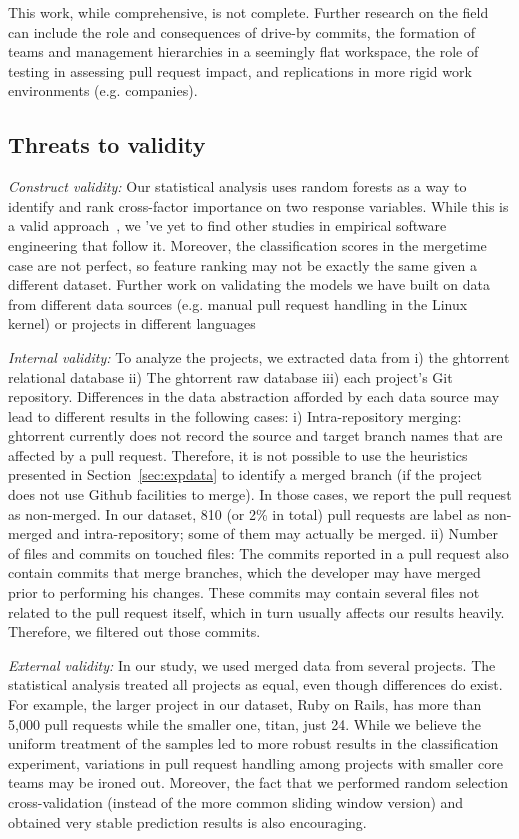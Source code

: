\documentclass{sig-alternate}
\begin{document}
This work, while comprehensive, is not complete. Further research
on the field can include the role and consequences of drive-by commits, 
the formation of teams and management hierarchies in a seemingly flat
workspace, the role of testing in assessing pull request impact,
and replications in more rigid work environments (e.g. companies).

\subsection{Threats to validity}

\emph{Construct validity:} Our statistical analysis uses random forests as a way
to identify and rank cross-factor importance on two response variables.  While
this is a valid approach~\cite{Genue10}, we 've yet to find other studies in
empirical software engineering that follow it. Moreover, the classification
scores in the \textsf{mergetime} case are not perfect, so feature ranking may
not be exactly the same given a different dataset. Further work on validating
the models we have built on data from different data sources (e.g. manual pull
request handling in the Linux kernel) or projects in different languages 

\emph{Internal validity:}
To analyze the projects, we extracted data from i) the {\sc ght}orrent relational
database ii) The {\sc ght}orrent raw database iii) each project's Git repository.
Differences in the data abstraction afforded by each data source may
lead to different results in the following cases: 
i) Intra-repository merging: {\sc ght}orrent currently does not record the source
    and target branch names that are affected by a pull request. Therefore, it
    is not possible to use the heuristics presented in
    Section~\ref{sec:expdata} to identify a merged branch (if the project
    does not use Github facilities to merge). In those cases, we
    report the pull request as non-merged. In our dataset, 810 (or 2\% in total)
    pull requests are label as non-merged and intra-repository; some of them may
    actually be merged.
ii) Number of files and commits on touched files: The commits reported
    in a pull request also contain commits that merge branches, which the
    developer may have merged prior to performing his changes. These commits
    may contain several files not related to the pull request itself, which
    in turn usually affects our results heavily. Therefore, we  
    filtered out those commits.

\emph{External validity:}
In our study, we used merged data from several projects. The statistical
analysis treated all projects as equal, even though differences do exist.
For example, the larger project in our dataset, Ruby on Rails, 
has more than 5,000 pull requests while the smaller one, \textsf{titan}, just 24.
While we believe the uniform treatment of the samples led to more robust
results in the classification experiment, variations in pull request
handling among projects with smaller core teams may be ironed out.
Moreover, the fact that we performed random selection cross-validation (instead
of the more common sliding window version) and obtained very stable prediction
results is also encouraging.
\end{document}
